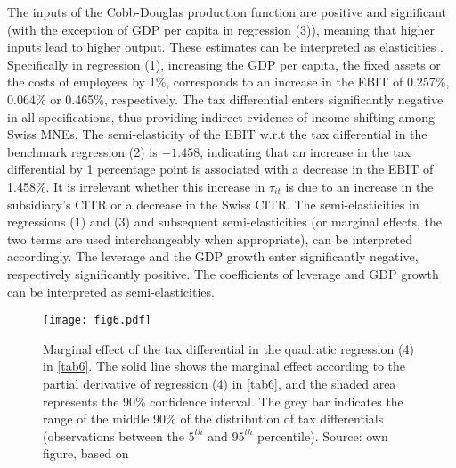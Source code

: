 \documentclass[10pt,twocolumn,oneside,cmyk]{article}
\begin{document}
The inputs of the Cobb-Douglas production function are positive and significant (with the exception of GDP per capita in regression (3)), meaning that higher inputs lead to higher output. These estimates can be interpreted as elasticities \parencite[45-46]{wooldridge_introductory_2009}. Specifically in regression (1), increasing the GDP per capita, the fixed assets or the costs of employees by 1\%, corresponds to an increase in the EBIT of 0.257\%, 0.064\% or 0.465\%, respectively. The tax differential enters significantly negative in all specifications, thus providing indirect evidence of income shifting among Swiss MNEs. The semi-elasticity of the EBIT w.r.t the tax differential in the benchmark regression (2) is $-1.458$, indicating that an increase in the tax differential by 1 percentage point is associated with a decrease in the EBIT of 1.458\%. It is irrelevant whether this increase in $\tau_{it}$ is due to an increase in the subsidiary's CITR or a decrease in the Swiss CITR. The semi-elasticities in regressions (1) and (3) and subsequent semi-elasticities (or marginal effects, the two terms are used interchangeably when appropriate), can be interpreted accordingly. The leverage and the GDP growth enter significantly negative, respectively significantly positive. The coefficients of leverage and GDP growth can be interpreted as semi-elasticities.

\begin{figure}[t]
 \centering \captionsetup{width=0.95\linewidth}
  \texttt{[image: fig6.pdf]} 
 \caption[Marginal effect of the tax differential in the quadratic regression (4) in \cref{tab6}]{Marginal effect of the tax differential in the quadratic regression (4) in \cref{tab6}. The solid line shows the marginal effect according to the partial derivative of regression (4) in \cref{tab6}, and the shaded area represents the 90\% confidence interval. The grey bar indicates the range of the middle 90\% of the distribution of tax differentials (observations between the $5^{th}$ and $95^{th}$ percentile). Source: own figure, based on \textcite[661]{berry_improving_2012}} \label{fig6}
\end{figure}
\end{document}
